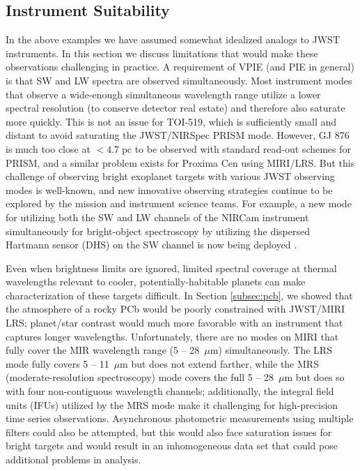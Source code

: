 \documentclass[twocolumn,linenumbers]{aastex7}
\begin{document}
\subsection{Instrument Suitability}\label{subsec:inst}
In the above examples we have assumed somewhat idealized analogs to JWST instruments. In this section we discuss limitations that would make these observations challenging in practice. A requirement of VPIE (and PIE in general) is that SW and LW spectra are observed simultaneously. Most instrument modes that observe a wide-enough simultaneous wavelength range utilize a lower spectral resolution (to conserve detector real estate) and therefore also saturate more quickly. This is not an issue for TOI-519, which is sufficiently small and distant to avoid saturating the JWST/NIRSpec PRISM mode.  However, GJ 876 is much too close at $<4.7\;\mathrm{pc}$ to be observed with standard read-out schemes for PRISM, and a similar problem exists for Proxima Cen using MIRI/LRS. But this challenge of observing bright exoplanet targets with various JWST observing modes is well-known, and new innovative observing strategies continue to be explored by the mission and instrument science teams.  For example, a new mode for utilizing both the SW and LW channels of the NIRCam instrument simultaneously for bright-object spectroscopy by utilizing the dispersed Hartmann sensor (DHS) on the SW channel is now being deployed \citep{schlawin2017}. 

Even when brightness limits are ignored, limited spectral coverage at thermal wavelengths relevant to cooler, potentially-habitable planets can make characterization of these targets difficult. In Section \ref{subsec:pcb}, we showed that the atmosphere of a rocky PCb would be poorly constrained with JWST/MIRI LRS; planet/star contrast would much more favorable with an instrument that captures longer wavelengths. Unfortunately, there are no modes on MIRI that fully cover the MIR wavelength range (5 -- 28~$\mu$m) simultaneously. The LRS mode fully covers 5 -- 11~$\mu$m but does not extend farther, while the MRS (moderate-resolution spectroscopy) mode covers the full 5 -- 28~$\mu$m but does so with four non-contiguous wavelength channels; additionally, the integral field units (IFUs) utilized by the MRS mode make it challenging for high-precision time series observations. Asynchronous photometric measurements using multiple filters could also be attempted, but this would also face saturation issues for bright targets and would result in an inhomogeneous data set that could pose additional problems in analysis.
\end{document}
